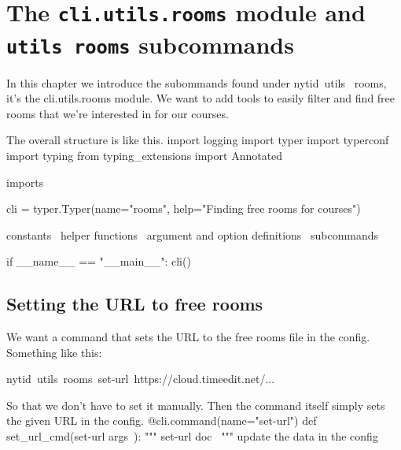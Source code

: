 \chapter{The \texttt{cli.utils.rooms} module and \texttt{utils rooms} %
subcommands}%
\label{cli.utils.rooms}

In this chapter we introduce the subommands found under {\Tt{}nytid\ utils\ \nwnewline
rooms\nwendquote},
it's the {\Tt{}cli.utils.rooms\nwendquote} module.
We want to add tools to easily filter and find free rooms that we're interested 
in for our courses.

The overall structure is like this.
\endmoddef\nwstartdeflinemarkup\nwenddeflinemarkup
import logging
import typer
import typerconf
import typing
from typing_extensions import Annotated

\LA{}imports~{\nwtagstyle{}}\RA{}

cli = typer.Typer(name="rooms",
                  help="Finding free rooms for courses")

\LA{}constants~{\nwtagstyle{}}\RA{}
\LA{}helper functions~{\nwtagstyle{}}\RA{}
\LA{}argument and option definitions~{\nwtagstyle{}}\RA{}
\LA{}subcommands~{\nwtagstyle{}}\RA{}

if __name__ == "__main__":
  cli()
\nwendcode{}\nwdocspar


\section{Setting the URL to free rooms}

We want a command that sets the URL to the free rooms file in the config.
Something like this:
\begin{center}
{\Tt{}nytid\ utils\ rooms\ set-url\ https://cloud.timeedit.net/...\nwendquote}
\end{center}
So that we don't have to set it manually.
Then the command itself simply sets the given URL in the config.
\nwenddocs{}\endmoddef\nwstartdeflinemarkup{}\nwenddeflinemarkup
@cli.command(name="set-url")
def set_url_cmd(\LA{}\code{}set-url\edoc{} args~{\nwtagstyle{}}\RA{}):
  """
  \LA{}\code{}set-url\edoc{} doc~{\nwtagstyle{}}\RA{}
  """
  \LA{}update the data in the config~{\nwtagstyle{}}\RA{}
\nwendcode{}\nwdocspar

